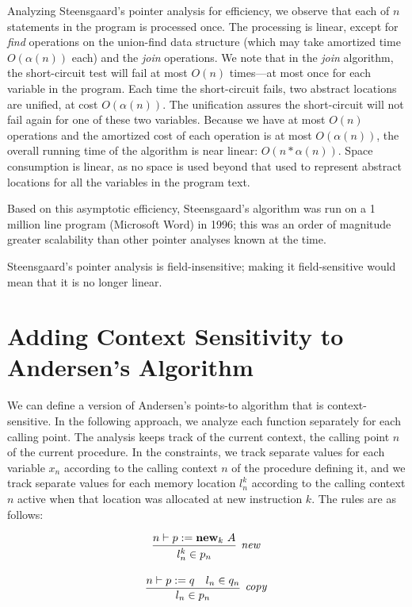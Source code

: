 \documentclass[11pt]{article}
\begin{document}
\begin{sloppypar}
Analyzing Steensgaard's pointer analysis for efficiency, we observe that each of $n$ statements in the program is processed once.  The processing is linear, except for \textit{find} operations on the union-find data structure (which may take amortized time $O(\alpha(n))$ each) and the \textit{join} operations.  We note that in the \textit{join} algorithm, the short-circuit test will fail at most $O(n)$ times---at most once for each variable in the program.  Each time the short-circuit fails, two abstract locations are unified, at cost $O(\alpha(n))$.  The unification assures the short-circuit will not fail again for one of these two variables.  Because we have at most $O(n)$ operations and the amortized cost of each operation is at most $O(\alpha(n))$, the overall running time of the algorithm is near linear: $O(n * \alpha(n))$.  Space consumption is linear, as no space is used beyond that used to represent abstract locations for all the variables in the program text.

Based on this asymptotic efficiency, Steensgaard's algorithm was run on a 1 million line program (Microsoft Word) in 1996; this was an order of magnitude greater scalability than other pointer analyses known at the time.

Steensgaard's pointer analysis is field-insensitive; making it field-sensitive would mean that it is no longer linear.


\section{Adding Context Sensitivity to Andersen's Algorithm}

We can define a version of Andersen's points-to algorithm that is context-sensitive.  In the following approach, we analyze each function separately for each calling point.  The analysis keeps track of the current context, the calling point $n$ of the current procedure.  In the constraints, we track separate values for each variable $x_n$ according to the calling context $n$ of the procedure defining it, and we track separate values for each memory location $l^k_n$ according to the calling context $n$ active when that location was allocated at new instruction $k$.  The rules are as follows:

\[
\begin{array}{c}
\infer[\textit{new}]
	{l^k_n \in p_n}
	{n \vdash p := \mathbf{new}_k~A}\\[3ex]

\infer[\textit{copy}]
	{l_n \in p_n}
	{n \vdash p := q & l_n \in q_n}\\[3ex]
		

\end{array}\]
\end{sloppypar}
\end{document}
